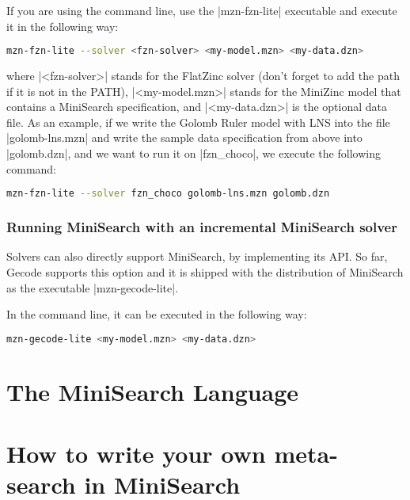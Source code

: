 \documentclass[a4paper,13pt,onecolumn]{article}%
\begin{document}
If you are using the command line, use the \mzninline|mzn-fzn-lite|
executable and execute it in the following way:
\begin{lstlisting}[language=bash]
mzn-fzn-lite --solver <fzn-solver> <my-model.mzn> <my-data.dzn>
\end{lstlisting}
where \mzninline|<fzn-solver>| stands for the FlatZinc
solver (don't forget to add the path if it is not in the PATH), 
\mzninline|<my-model.mzn>| stands for the MiniZinc model that
contains a MiniSearch specification, and \mzninline|<my-data.dzn>|
is the optional data file. As an example, if we write the 
Golomb Ruler model with LNS into the file \mzninline|golomb-lns.mzn|
and write the sample data specification from above into 
\mzninline|golomb.dzn|, and we want to run it on \mzninline|fzn_choco|,
we execute the following command:
\begin{lstlisting}[language=bash]
mzn-fzn-lite --solver fzn_choco golomb-lns.mzn golomb.dzn
\end{lstlisting}

\subsubsection{Running MiniSearch with an incremental MiniSearch solver}

Solvers can also directly support MiniSearch, by implementing its API.
So far, Gecode supports this option and it is shipped with the distribution
of MiniSearch as the executable \mzninline|mzn-gecode-lite|.

In the command line, it can be executed in the following way:
\begin{lstlisting}[language=bash]
mzn-gecode-lite <my-model.mzn> <my-data.dzn>
\end{lstlisting}

\section{The MiniSearch Language}
\label{sec:minisearch}


\section{How to write your own meta-search in MiniSearch}
\label{sec:ownsearch}
\end{document}
